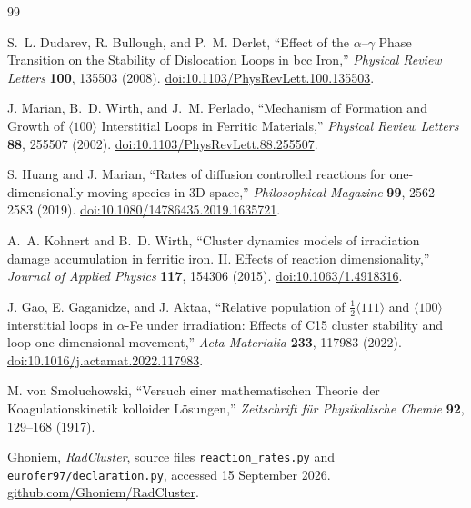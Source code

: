 \documentclass[11pt,a4paper]{article}
\newcommand{\half}{\tfrac12}
\newcommand{\code}[1]{\texttt{#1}}
\begin{document}
\begin{thebibliography}{99}

S.~L. Dudarev, R. Bullough, and P.~M. Derlet,
``Effect of the $\alpha$--$\gamma$ Phase Transition on the Stability of
Dislocation Loops in bcc Iron,'' \emph{Physical Review Letters} \textbf{100},
135503 (2008).
\href{https://doi.org/10.1103/PhysRevLett.100.135503}{doi:10.1103/PhysRevLett.100.135503}.

J. Marian, B.~D. Wirth, and J.~M. Perlado,
``Mechanism of Formation and Growth of $\langle100\rangle$ Interstitial Loops
in Ferritic Materials,'' \emph{Physical Review Letters} \textbf{88}, 255507
(2002).
\href{https://doi.org/10.1103/PhysRevLett.88.255507}{doi:10.1103/PhysRevLett.88.255507}.

S. Huang and J. Marian,
``Rates of diffusion controlled reactions for one-dimensionally-moving species
in 3D space,'' \emph{Philosophical Magazine} \textbf{99}, 2562--2583 (2019).
\href{https://doi.org/10.1080/14786435.2019.1635721}{doi:10.1080/14786435.2019.1635721}.

A.~A. Kohnert and B.~D. Wirth,
``Cluster dynamics models of irradiation damage accumulation in ferritic iron.
II. Effects of reaction dimensionality,'' \emph{Journal of Applied Physics}
\textbf{117}, 154306 (2015).
\href{https://doi.org/10.1063/1.4918316}{doi:10.1063/1.4918316}.

J. Gao, E. Gaganidze, and J. Aktaa,
``Relative population of $\half\langle111\rangle$ and $\langle100\rangle$
interstitial loops in $\alpha$-Fe under irradiation: Effects of C15 cluster
stability and loop one-dimensional movement,'' \emph{Acta Materialia}
\textbf{233}, 117983 (2022).
\href{https://doi.org/10.1016/j.actamat.2022.117983}{doi:10.1016/j.actamat.2022.117983}.

M. von Smoluchowski,
``Versuch einer mathematischen Theorie der Koagulationskinetik kolloider
Lösungen,'' \emph{Zeitschrift für Physikalische Chemie} \textbf{92}, 129--168
(1917).

Ghoniem, \emph{RadCluster}, source files
\code{reaction\_rates.py} and \code{eurofer97/declaration.py}, accessed
15 September 2026.
\href{https://github.com/Ghoniem/RadCluster}{github.com/Ghoniem/RadCluster}.

\end{thebibliography}
\end{document}
